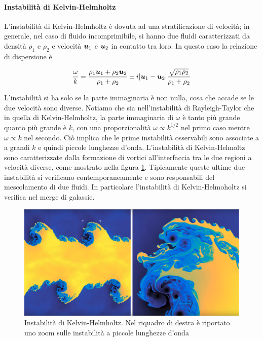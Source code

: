 \paragraph{Instabilità di Kelvin-Helmholtz}
L'instabilità di Kelvin-Helmholtz è dovuta ad una stratificazione di velocità; in generale, nel caso di fluido incomprimibile, si hanno due fluidi caratterizzati da densità $\rho_1$ e $\rho_2$ e velocità $\V{u}_1$ e $\V{u}_2$ in contatto tra loro. In questo caso la relazione di dispersione è 
\begin{EQ}
\begin{equation}
\dfrac{\omega}{k} = \dfrac{\rho_1\V{u}_1+\rho_2\V{u}_2}{\rho_1+\rho_2} \pm i |\V{u}_1-\V{u}_2|\dfrac{\sqrt{\rho_1\rho_2}}{\rho_1+\rho_2}
\end{equation}
\end{EQ}
L'instabilità si ha solo se la parte immaginaria è non nulla, cosa che accade se le due velocità sono diverse. Notiamo che sia nell'instabilità di Rayleigh-Taylor che in quella di Kelvin-Helmholtz, la parte immaginaria di $\omega$ è tanto più grande quanto più grande è $k$, con una proporzionalità $\omega\propto k^{1/2}$ nel primo caso mentre $\omega\propto k$ nel secondo. Ciò implica che le prime instabilità osservabili sono associate a a grandi $k$ e quindi piccole lunghezze d'onda. L'instabilità di Kelvin-Helmoltz sono caratterizzate dalla formazione di vortici all'interfaccia tra le due regioni a velocità diverse, come mostrato nella figura \ref{im:KelvinHelmholtz}. Tipicamente queste ultime due instabilità si verificano contemporaneamente e sono responsabili del mescolamento di due fluidi. In particolare l'instabilità di Kelvin-Helmoholtz si verifica nel merge di galassie.
\begin{figure}
\includegraphics[width=\textwidth]{img/Kelvin}
\caption{Instabilità di Kelvin-Helmholtz. Nel riquadro di destra è riportato uno zoom sulle instabilità a piccole lunghezze d'onda}
\label{im:KelvinHelmholtz}
\end{figure}

